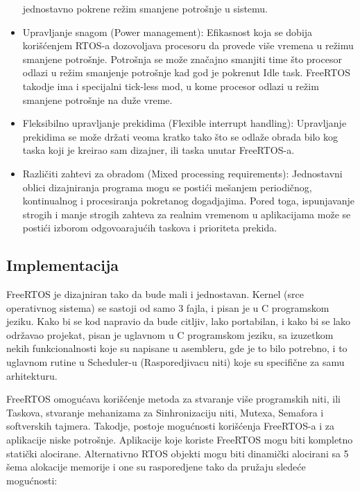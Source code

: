 \documentclass[a4paper,12pt, master]{etf}
\begin{document}
\begin{itemize}
		jednostavno pokrene re\v{z}im smanjene potro\v{s}nje u sistemu.
		\item Upravljanje snagom (Power management):
		Efikasnost koja se dobija kori\v{s}\'{c}enjem RTOS-a dozovoljava procesoru da provede vi\v{s}e 
		vremena	u re\v{z}imu smanjene potro\v{s}nje. Potro\v{s}nja se mo\v{z}e zna\v{c}ajno smanjiti time 
		\v{s}to procesor odlazi u re\v{z}im smanjenje potro\v{s}nje kad god je pokrenut Idle task. FreeRTOS 
		takodje ima i specijalni tick-less mod, u kome procesor odlazi u re\v{z}im smanjene 
		potro\v{s}nje na du\v{z}e vreme.
		\item Fleksibilno upravljanje prekidima (Flexible interrupt handling):
		Upravljanje prekidima se mo\v{z}e dr\v{z}ati veoma kratko tako \v{s}to se odla\v{z}e obrada bilo kog 
		taska koji je kreirao sam dizajner, ili taska unutar FreeRTOS-a.
		\item Razli\v{c}iti zahtevi za obradom (Mixed processing requirements):
		Jednostavni oblici dizajniranja programa mogu se posti\'{c}i me\v{s}anjem periodi\v{c}nog, 
		kontinualnog i procesiranja pokretanog dogadjajima. Pored toga, ispunjavanje strogih i 
		manje strogih zahteva za realnim vremenom u aplikacijama mo\v{z}e se posti\'{c}i izborom 
		odgovoaraju\'{c}ih taskova i prioriteta prekida.

	\end{itemize}
	
	\subsection{Implementacija}

	FreeRTOS je dizajniran tako da bude mali i jednostavan. Kernel (srce operativnog sistema) 
	se sastoji od samo 3 fajla, i pisan je u C programskom jeziku. Kako bi se kod napravio da 
	bude citljiv, lako portabilan, i kako bi se lako odr\v{z}avao projekat, pisan je uglavnom u C
	programskom jeziku, sa izuzetkom nekih funkcionalnosti koje su napisane u asembleru, gde je to
	bilo potrebno, i to uglavnom rutine u Scheduler-u (Rasporedjivacu niti) koje su specifi\v{c}ne 
	za samu arhitekturu.

	FreeRTOS omogu\'{c}ava kori\v{s}\'{c}enje metoda za stvaranje vi\v{s}e programskih niti, 
	ili Taskova, stvaranje mehanizama za Sinhronizaciju niti, Mutexa, Semafora i softverskih tajmera. 
	Takodje, postoje mogu\'{c}nosti kori\v{s}\'{c}enja FreeRTOS-a i za aplikacije niske potro\v{s}nje. 
	Aplikacije koje koriste FreeRTOS mogu biti kompletno stati\v{c}ki alocirane. Alternativno 
	RTOS objekti mogu biti dinami\v{c}ki alocirani sa 5 \v{s}ema alokacije memorije i one su rasporedjene 
	tako da pru\v{z}aju slede\'{c}e mogu\'{c}nosti:
	
\end{document}
